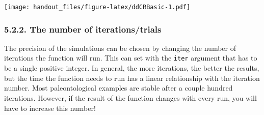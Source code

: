 \documentclass[]{article}
\begin{document}
\texttt{[image: handout\_files/figure-latex/ddCRBasic-1.pdf]}

\subsubsection{5.2.2. The number of
iterations/trials}\label{the-number-of-iterationstrials}

The precision of the simulations can be chosen by changing the number of
iterations the function will run. This can set with the \texttt{iter}
argument that has to be a single positive integer. In general, the more
iterations, the better the results, but the time the function needs to
run has a linear relationship with the iteration number. Most
paleontological examples are stable after a couple hundred iterations.
However, if the result of the function changes with every run, you will
have to increase this number!
\end{document}
